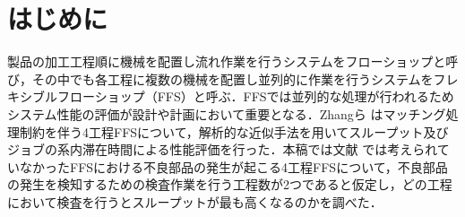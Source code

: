 \documentclass{iseman}
\begin{document}
\noindent
{}


\setcounter{page}{5}
\section{はじめに}\label{sec:intro}
製品の加工工程順に機械を配置し流れ作業を行うシステムをフローショップと呼び，その中でも各工程に複数の機械を配置し並列的に作業を行うシステムをフレキシブルフローショップ（FFS）と呼ぶ．FFSでは並列的な処理が行われるためシステム性能の評価が設計や計画において重要となる．Zhangら \cite{1} はマッチング処理制約を伴う4工程FFSについて，解析的な近似手法を用いてスループット及びジョブの系内滞在時間による性能評価を行った．本稿では文献 \cite{1} では考えられていなかったFFSにおける不良部品の発生が起こる4工程FFSについて，不良部品の発生を検知するための検査作業を行う工程数が2つであると仮定し，どの工程において検査を行うとスループットが最も高くなるのかを調べた．
\end{document}
